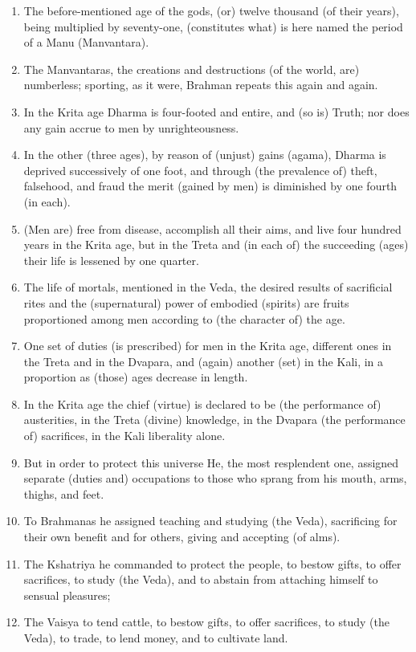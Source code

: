 \begin{enumerate}
\item The before-mentioned age of the gods, (or) twelve thousand (of their years), being multiplied by seventy-one, (constitutes what) is here named the period of a Manu (Manvantara).
\item The Manvantaras, the creations and destructions (of the world, are) numberless; sporting, as it were, Brahman repeats this again and again.
\item In the Krita age Dharma is four-footed and entire, and (so is) Truth; nor does any gain accrue to men by unrighteousness.
\item In the other (three ages), by reason of (unjust) gains (agama), Dharma is deprived successively of one foot, and through (the prevalence of) theft, falsehood, and fraud the merit (gained by men) is diminished by one fourth (in each).
\item (Men are) free from disease, accomplish all their aims, and live four hundred years in the Krita age, but in the Treta and (in each of) the succeeding (ages) their life is lessened by one quarter.
\item The life of mortals, mentioned in the Veda, the desired results of sacrificial rites and the (supernatural) power of embodied (spirits) are fruits proportioned among men according to (the character of) the age.
\item One set of duties (is prescribed) for men in the Krita age, different ones in the Treta and in the Dvapara, and (again) another (set) in the Kali, in a proportion as (those) ages decrease in length.
\item In the Krita age the chief (virtue) is declared to be (the performance of) austerities, in the Treta (divine) knowledge, in the Dvapara (the performance of) sacrifices, in the Kali liberality alone.
\item But in order to protect this universe He, the most resplendent one, assigned separate (duties and) occupations to those who sprang from his mouth, arms, thighs, and feet.
\item To Brahmanas he assigned teaching and studying (the Veda), sacrificing for their own benefit and for others, giving and accepting (of alms).
\item The Kshatriya he commanded to protect the people, to bestow gifts, to offer sacrifices, to study (the Veda), and to abstain from attaching himself to sensual pleasures;
\item The Vaisya to tend cattle, to bestow gifts, to offer sacrifices, to study (the Veda), to trade, to lend money, and to cultivate land.

\end{enumerate}
